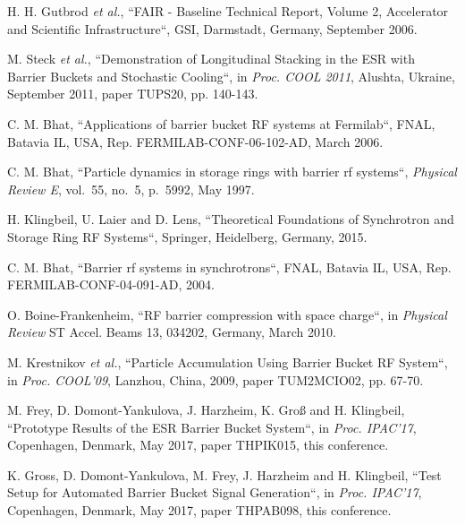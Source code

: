 \documentclass[a4paper,
              ]{jacow}
\begin{document}
\begin{thebibliography}{99} %

	H. H. Gutbrod \textit{et al.}, “FAIR - Baseline Technical Report, Volume 2, Accelerator and Scientific Infrastructure“,
	GSI, Darmstadt, Germany, September 2006.
			
	M. Steck \textit{et al.}, “Demonstration of Longitudinal Stacking in the ESR with Barrier Buckets and Stochastic Cooling“,
	in \textit{Proc. COOL 2011}, Alushta, Ukraine, September 2011, paper TUPS20, pp. 140-143.
	
	C. M. Bhat, “Applications of barrier bucket RF systems at Fermilab“,
	FNAL, Batavia IL, USA, Rep. FERMILAB-CONF-06-102-AD, March 2006.
	
		
	C. M. Bhat, “Particle dynamics in storage rings with barrier rf systems“,
	\textit{Physical Review E}, vol.~55, no.~5, p.~5992, May 1997.

	
	H. Klingbeil, U. Laier and D. Lens, “Theoretical Foundations of Synchrotron and Storage Ring RF Systems“,
	Springer, Heidelberg, Germany, 2015.
	
	C. M. Bhat, “Barrier rf systems in synchrotrons“,
	FNAL, Batavia IL, USA, Rep. FERMILAB-CONF-04-091-AD, 2004.
		
	O. Boine-Frankenheim, “RF barrier compression with space charge“,
	in \textit{Physical Review} ST Accel. Beams 13, 034202,
	Germany, March 2010.
	
	M. Krestnikov \textit{et al.}, “Particle Accumulation Using Barrier Bucket RF System“,
	in \textit{Proc. COOL'09}, Lanzhou, China, 2009, paper TUM2MCIO02, pp. 67-70.
	
	M. Frey, D. Domont-Yankulova, J. Harzheim, K. Groß and H. Klingbeil, “Prototype Results of the ESR Barrier Bucket System“,
	in \textit{Proc. IPAC'17}, Copenhagen, Denmark, May 2017, paper THPIK015, this conference.
	
	K. Gross, D. Domont-Yankulova, M. Frey, J. Harzheim and H. Klingbeil, “Test Setup for Automated Barrier Bucket Signal Generation“,
	in \textit{Proc. IPAC'17}, Copenhagen, Denmark, May 2017, paper THPAB098, this conference.


\end{thebibliography}
\end{document}
